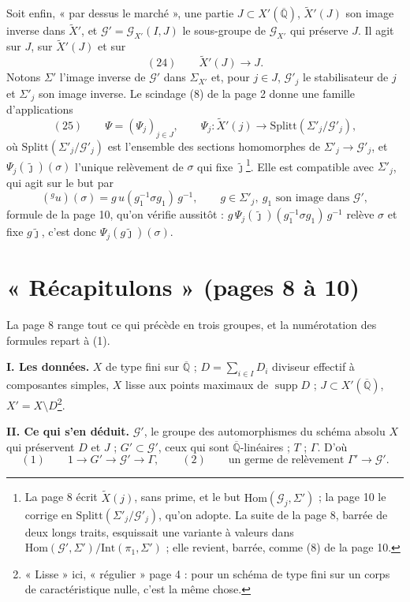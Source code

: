 \documentclass[11pt,a4paper]{article}
\begin{document}
Soit enfin, « par dessus le marché », une partie $J \subset
X'(\overline{\mathbb{Q}})$, $\widetilde X'(J)$ son image inverse dans
$\widetilde X'$, et $\mathcal{G}' = \mathcal{G}_{X'}(I, J)$ le sous-groupe de
$\mathcal{G}_{X'}$ qui préserve $J$. Il agit sur $J$, sur $\widetilde X'(J)$ et
sur
\[
(24)\qquad \widetilde X'(J) \longrightarrow J .
\]
Notons $\Sigma'$ l'image inverse de $\mathcal{G}'$ dans $\Sigma_{X'}$ et, pour
$j \in J$, $\mathcal{G}'_j$ le stabilisateur de $j$ et $\Sigma'_j$ son image
inverse. Le scindage (8) de la page 2 donne une famille d'applications
\[
(25)\qquad \Psi = (\Psi_j)_{j \in J}, \qquad \Psi_j : \widetilde X'(j)
\longrightarrow \mathrm{Splitt}(\Sigma'_j/\mathcal{G}'_j),
\]
où $\mathrm{Splitt}(\Sigma'_j/\mathcal{G}'_j)$ est l'ensemble des sections
homomorphes de $\Sigma'_j \to \mathcal{G}'_j$, et $\Psi_j(\tilde\jmath)(\sigma)$
l'unique relèvement de $\sigma$ qui fixe $\tilde\jmath$\footnote{La page 8 écrit
$\widetilde{X}(j)$, sans prime, et le but
$\mathrm{Hom}(\mathcal{G}_j, \Sigma')$ ; la page 10 le corrige en
$\mathrm{Splitt}(\Sigma'_j/\mathcal{G}'_j)$, qu'on adopte. La suite de la page
8, barrée de deux longs traits, esquissait une variante à valeurs dans
$\mathrm{Hom}(\mathcal{G}', \Sigma')/\mathrm{Int}(\pi_1, \Sigma')$ ; elle revient,
barrée, comme (8) de la page 10.}. Elle est compatible avec $\Sigma'_j$, qui
agit sur le but par
\[
({}^{g}u)(\sigma) = g\, u(g_1^{-1}\sigma g_1)\, g^{-1}, \qquad
g \in \Sigma'_j,\ g_1 \text{ son image dans } \mathcal{G}',
\]
formule de la page 10, qu'on vérifie aussitôt : $g\,\Psi_j(\tilde\jmath)(g_1^{-1}
\sigma g_1)\,g^{-1}$ relève $\sigma$ et fixe $g\tilde\jmath$, c'est donc
$\Psi_j(g\tilde\jmath)(\sigma)$.

\section*{« Récapitulons » (pages 8 à 10)}

La page 8 range tout ce qui précède en trois groupes, et la numérotation des
formules repart à (1).

\textbf{I. Les données.} $X$ de type fini sur $\overline{\mathbb{Q}}$ ;
$D = \sum_{i \in I} D_i$ diviseur effectif à composantes simples, $X$ lisse aux
points maximaux de $\operatorname{supp} D$ ; $J \subset X'(\overline{\mathbb{Q}})$,
$X' = X \setminus D$\footnote{« Lisse » ici, « régulier » page 4 : pour un
schéma de type fini sur un corps de caractéristique nulle, c'est la même
chose.}.

\textbf{II. Ce qui s'en déduit.} $\mathcal{G}'$, le groupe des automorphismes
du schéma absolu $X$ qui préservent $D$ et $J$ ; $G' \subset \mathcal{G}'$, ceux
qui sont $\overline{\mathbb{Q}}$-linéaires ; $T$ ; $\Gamma$. D'où
\[
(1)\qquad 1 \to G' \to \mathcal{G}' \to \Gamma, \qquad
(2)\qquad \text{un germe de relèvement } \Gamma' \to \mathcal{G}'.
\]
\end{document}
